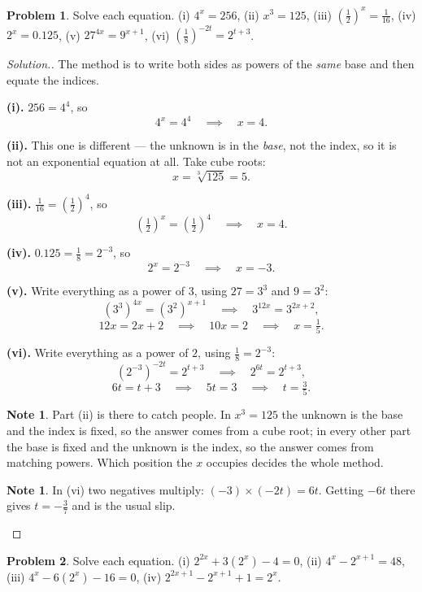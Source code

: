 \documentclass[11pt,a4paper]{article}
\theoremstyle{definition}
\newtheorem{note}[thm]{Note}
\newtheorem{problemx}{Problem}[section]
\newenvironment{problem}{\begin{problemx}}{\end{problemx}}
\newenvironment{solution}
  {\renewcommand{\qedsymbol}{}\begin{proof}[\textit{Solution}.]}
  {\end{proof}}
\begin{document}
\begin{problem}
Solve each equation.
\quad (i) $4^x=256$, \quad (ii) $x^3=125$, \quad
(iii) $\left(\frac{1}{2}\right)^x=\frac{1}{16}$, \quad (iv) $2^x=0.125$, \quad
(v) $27^{4x}=9^{x+1}$, \quad (vi) $\left(\frac{1}{8}\right)^{-2t}=2^{t+3}$.
\end{problem}

\begin{solution}
The method is to write both sides as powers of the \emph{same} base and then equate the
indices.

\textbf{(i).} $256=4^4$, so
$$4^x=4^4\quad\implies\quad x=4.$$

\textbf{(ii).} This one is different --- the unknown is in the \emph{base}, not the
index, so it is not an exponential equation at all. Take cube roots:
$$x=\sqrt[3]{125}=5.$$

\textbf{(iii).} $\frac{1}{16}=\left(\frac{1}{2}\right)^4$, so
$$\left(\tfrac{1}{2}\right)^x=\left(\tfrac{1}{2}\right)^4\quad\implies\quad x=4.$$

\textbf{(iv).} $0.125=\frac{1}{8}=2^{-3}$, so
$$2^x=2^{-3}\quad\implies\quad x=-3.$$

\textbf{(v).} Write everything as a power of $3$, using $27=3^3$ and $9=3^2$:
$$\left(3^3\right)^{4x}=\left(3^2\right)^{x+1}\quad\implies\quad 3^{12x}=3^{2x+2},$$
$$12x=2x+2\quad\implies\quad 10x=2\quad\implies\quad x=\tfrac{1}{5}.$$

\textbf{(vi).} Write everything as a power of $2$, using $\frac{1}{8}=2^{-3}$:
$$\left(2^{-3}\right)^{-2t}=2^{t+3}\quad\implies\quad 2^{6t}=2^{t+3},$$
$$6t=t+3\quad\implies\quad 5t=3\quad\implies\quad t=\tfrac{3}{5}.$$

\begin{note}
Part (ii) is there to catch people. In $x^3=125$ the unknown is the base and the index
is fixed, so the answer comes from a cube root; in every other part the base is fixed
and the unknown is the index, so the answer comes from matching powers. Which position
the $x$ occupies decides the whole method.
\end{note}

\begin{note}
In (vi) two negatives multiply: $(-3)\times(-2t)=6t$. Getting $-6t$ there gives
$t=-\frac{3}{7}$ and is the usual slip.
\end{note}
\end{solution}

\begin{problem}
Solve each equation.
\quad (i) $2^{2x}+3\left(2^x\right)-4=0$, \quad (ii) $4^x-2^{x+1}=48$, \quad
(iii) $4^x-6\left(2^x\right)-16=0$, \quad
(iv) $2^{2x+1}-2^{x+1}+1=2^x$.
\end{problem}
\end{document}
